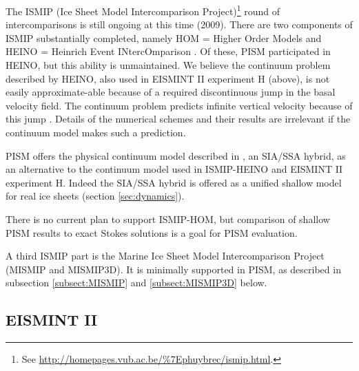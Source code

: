 The ISMIP (Ice Sheet Model Intercomparison Project)\footnote{See \url{http://homepages.vub.ac.be/\%7Ephuybrec/ismip.html}.} round of intercomparisons is still ongoing at this time (2009).  There are two components of ISMIP substantially completed, namely HOM = Higher Order Models \cite{ISMIPHOM,HOMelmer} and HEINO = Heinrich Event INtercOmparison \cite{GreveTakahamaCalov,Calovetal2009HEINOfinal}.  Of these, PISM participated in HEINO, but this ability is unmaintained.   We believe the continuum problem described by HEINO, also used in EISMINT II experiment H (above), is not easily approximate-able because of a required discontinuous jump in the basal velocity field.  The continuum problem predicts infinite vertical velocity because of this jump \cite[Appendix B]{BBssasliding}.  Details of the numerical schemes and their results are irrelevant if the continuum model makes such a prediction.

PISM offers the physical continuum model described in \cite{BBssasliding}, an SIA/SSA hybrid, as an alternative to the continuum model used in ISMIP-HEINO and EISMINT II experiment H.  Indeed the SIA/SSA hybrid is offered as a unified shallow model for real ice sheets (section \ref{sec:dynamics}).

There is no current plan to support ISMIP-HOM, but comparison of shallow PISM results to exact Stokes solutions is a goal for PISM evaluation.

A third ISMIP part is the Marine Ice Sheet Model Intercomparison Project (MISMIP and MISMIP3D).  It is minimally supported in PISM, as described in subsection \ref{subsect:MISMIP} and \ref{subsect:MISMIP3D} below.


\subsection{EISMINT II}\label{subsect:EISMINTII}

